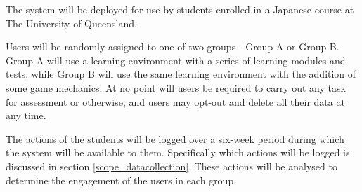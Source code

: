 The system will be deployed for use by students enrolled in a Japanese course at
The University of Queensland.

Users will be randomly assigned to one of two groups - Group A or Group B. Group
A will use a learning environment with a series of learning modules and tests,
while Group B will use the same learning environment with the addition of some 
game mechanics. At no point will users be required to carry out any task for
assessment or otherwise, and users may opt-out and delete all their data at
any time.

The actions of the students will be logged over a six-week period during which
the system will be available to them. Specifically which actions will be logged
is discussed in section \ref{scope_datacollection}. These actions will be 
analysed to determine the engagement of the users in each group.
